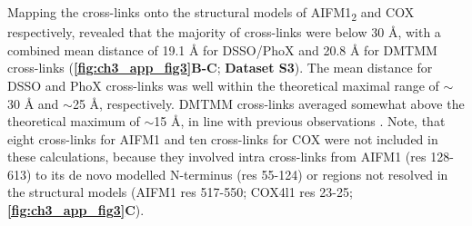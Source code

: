 Mapping the cross-links onto the structural models of AIFM1\textsubscript{2} and COX respectively, revealed that the majority of cross-links were below 30 Å, with a combined mean distance of 19.1 Å for DSSO/PhoX and 20.8 Å for DMTMM cross-links (\textbf{\autoref{fig:ch3_app_fig3}B-C}; \textbf{Dataset S3}). The mean distance for DSSO and PhoX cross-links was well within the theoretical maximal range of $\sim$30 Å and $\sim$25 Å, respectively. DMTMM cross-links averaged somewhat above the theoretical maximum of $\sim$15 Å, in line with previous observations \cite{RN14}. Note, that eight cross-links for AIFM1 and ten cross-links for COX were not included in these calculations, because they involved intra cross-links from AIFM1 (res 128-613) to its de novo modelled N-terminus (res 55-124) or regions not resolved in the structural models (AIFM1 res 517-550; COX4l1 res 23-25; \textbf{\autoref{fig:ch3_app_fig3}C}).


